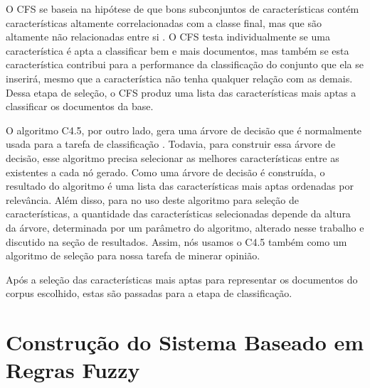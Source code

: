 O CFS se baseia na hipótese de que bons subconjuntos de características contém características altamente correlacionadas com a classe final, mas que são altamente não relacionadas entre si \cite{hall1999correlation}. O CFS testa individualmente se uma característica é apta a classificar bem e mais documentos, mas também se esta característica contribui para a performance da classificação do conjunto que ela se inserirá, mesmo que a característica não tenha qualquer relação com as demais. Dessa etapa de seleção, o CFS produz uma lista das características mais aptas a classificar os documentos da base. 


O algoritmo C4.5, por outro lado, gera uma árvore de decisão que é normalmente usada para a tarefa de classificação \cite{quinlan19934}. Todavia, para construir essa árvore de decisão, esse algoritmo precisa selecionar as melhores características entre as existentes a cada nó gerado. Como uma árvore de decisão é construída, o resultado do algoritmo é uma lista das características mais aptas ordenadas por relevância. Além disso, para no uso deste algoritmo para seleção de características, a quantidade das características selecionadas depende da altura da árvore, determinada por um parâmetro do algoritmo, alterado nesse trabalho e discutido na seção de resultados. Assim, nós usamos o C4.5 também como um algoritmo de seleção para nossa tarefa de minerar opinião. 

Após a seleção das características mais aptas para representar os documentos do corpus escolhido, estas são passadas para a etapa de classificação. 

\section{Construção do Sistema Baseado em Regras Fuzzy}

